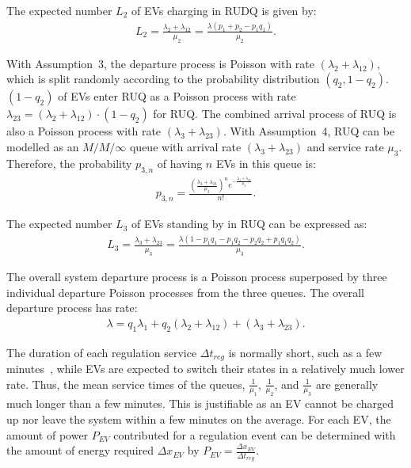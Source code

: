 \documentclass[journal]{IEEEtran}
\begin{document}
The expected number $L_2$ of EVs charging in RUDQ is given by:
\begin{align}
L_2 = \frac{\lambda_2 +\lambda_{12}}{\mu_2}
    = \frac{\lambda (p_1 + p_2 - p_1 q_1)}{\mu_2}.
\label{L_2}
\end{align} 

With Assumption~3, the departure process is Poisson with rate
$(\lambda_2 + \lambda_{12})$, which is split randomly according to the
probability distribution $(q_2, 1 - q_2)$.  $(1 - q_2)$ of EVs enter RUQ as
 a Poisson process with rate
$\lambda_{23} = (\lambda_2 + \lambda_{12}) \cdot (1 - q_2)$ for RUQ.  The
combined arrival process of RUQ is also a Poisson process with rate
$(\lambda_3 + \lambda_{23})$.  With Assumption~4, RUQ can be modelled as an
$M/M/\infty$ queue with arrival rate $(\lambda_3 + \lambda_{23})$ and service
rate $\mu_3$.  Therefore, the probability $p_{3, n}$ of having $n$ EVs in this
queue is:
\begin{align}
p_{3,n} = \frac{(\frac{\lambda_3 + \lambda_{23}}{\mu_3})^n
	  e^{- \frac{\lambda_3 + \lambda_{23}}{\mu_3}}}{n!}.
\end{align}

The expected number $L_3$ of EVs standing by in RUQ can be expressed as:
{\small
\begin{align}
L_3 = \frac{\lambda_3 + \lambda_{23}}{\mu_3}
    = \frac{\lambda (1 - p_1 q_1 - p_1 q_2 - p_2 q_2 + p_1 q_1 q_2)}{\mu_3}.
\label{L_3}
\end{align} 
}

The overall system departure process is a Poisson process superposed by three
individual departure Poisson processes from the three queues.  The overall
departure process has rate:
\begin{align}
\lambda = q_1 \lambda_1 + q_2 (\lambda_2 + \lambda_{12}) +
	  (\lambda_3 + \lambda_{23}).
\end{align}

The duration of each regulation service $\Delta t_{reg}$ is normally short,
such as a few minutes~\cite{frequencyregulation}, while EVs are expected to
switch their states in a relatively much lower rate.  Thus, the mean service
times of the queues, $\frac{1}{\mu_1}$, $\frac{1}{\mu_2}$, and
$\frac{1}{\mu_3}$ are generally much longer than a few minutes.  This is
justifiable as an EV cannot be charged up nor leave the system within a few
minutes on the average.  For each EV, the amount of power $P_{EV}$ contributed
for a regulation event can be determined with the amount of energy required
$\Delta x_{EV}$ by $P_{EV} = \frac{\Delta x_{EV}}{\Delta t_{reg}}.$
\end{document}
